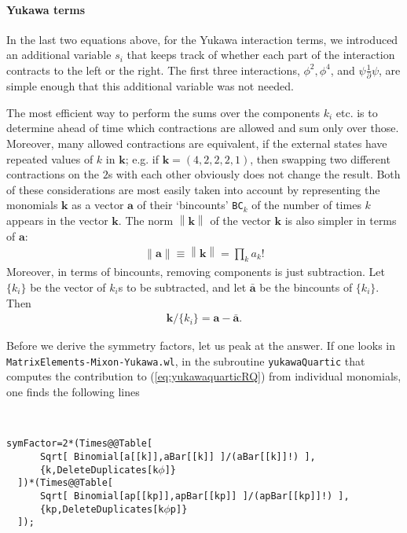 \documentclass[12pt]{article}
\newcommand{\be}{\begin{eqnarray}}
\newcommand{\ee}{\end{eqnarray}}
\newcommand{\p}{\partial}
\newcommand{\avec}{\boldsymbol{a}}
\newcommand{\bk}{\boldsymbol{k}}
\newcommand{\norm}[1]{\left\lVert#1\right\rVert}
\begin{document}
\paragraph{Yukawa terms}
In the last two equations above, for the Yukawa interaction terms, we introduced an additional variable $s_i$ that keeps track of whether each part of the interaction contracts to the left or the right. The first three interactions, $\phi^2, \phi^4$, and $\psi \frac{1}{\p} \psi$, are simple enough that this additional variable was not needed.  

The most efficient way to perform the sums over the components $k_i$ etc. is to determine ahead of time which contractions are allowed and sum only over those.  Moreover, many allowed contractions are equivalent, if the external states have repeated values of $k$ in $\bk$; e.g. if $\bk=(4,2,2,2,1)$, then swapping two different contractions on the $2$s  with each other obviously does not change the result.  Both of these considerations are most easily taken into account by representing the monomials $\bk$ as a vector $\avec$ of their `bincounts'  {\tt BC}$_k$ of the number of times $k$ appears in the vector $\bk$.  The norm $\norm{\bk}$ of the vector $\bk$ is also simpler in terms of $\avec$:
\be
\norm{\avec} \equiv \norm{\bk} = \prod_k a_k !
\ee
Moreover, in terms of bincounts, removing components is just subtraction.  Let $\{k_i\}$ be the vector of $k_i$s to be subtracted, and let $\bar{\avec}$ be the bincounts of $\{k_i\}$.  Then
\be
\bk/\{k_i\} = \avec- \bar{\avec}.
\ee

Before we derive the symmetry factors, let us peak at the answer. If one looks in {\tt MatrixElements-Mixon-Yukawa.wl}, in the subroutine {\tt yukawaQuartic} that computes the contribution to (\ref{eq:yukawaquarticRQ}) from individual monomials, one finds the following lines

\ 

\noindent
\verb|symFactor=2*(Times@@Table[| \\
\verb|		Sqrt[ Binomial[a[[k]],aBar[[k]] ]/(aBar[[k]]!) ],| \\
\verb|		{k,DeleteDuplicates[k|$\phi$\verb|]}| \\
\verb|	])*(Times@@Table[| \\
\verb|		Sqrt[ Binomial[ap[[kp]],apBar[[kp]] ]/(apBar[[kp]]!) ],|\\
\verb|		{kp,DeleteDuplicates[k|$\phi$\verb|p]}|\\
\verb|	]);|
\end{document}
